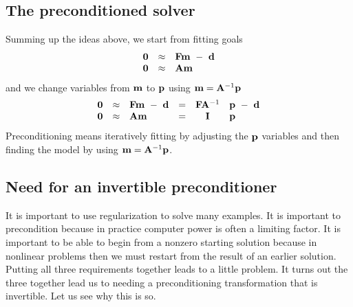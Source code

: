 \subsection{The preconditioned solver}
Summing up the ideas above,
we start from fitting goals
\begin{equation}
\begin{array}{lll}
\label{eq:main}
\bold 0 &\approx& \bold F \bold m \ -\  \bold d \\
\bold 0 &\approx& \bold A \bold m
\end{array}
\end{equation}
and we change variables from
$\bold m$ to $\bold p$ using
$\bold m = \bold A^{-1} \bold p$
\begin{equation}
\begin{array}{llllcl}
\bold 0 &\approx &  \bold F \bold m \ -\  \bold d   &=&
    \bold F  \bold A^{-1} &\bold p  \ -\  \bold d
\\
\bold 0 &\approx &  \bold A \bold m       &=&   \bold I        & \bold p
\end{array}
\label{eqn:precsummary}
\end{equation}
Preconditioning means iteratively fitting
by adjusting the $\bold p$ variables
and then finding the model by using
$\bold m = \bold A^{-1} \bold p$.

\begin{comment}
A new reusable
preconditioned solver is
the module \texttt{solver_prc} \vpageref{lst:solver_prc}.
Likewise the modeling operator $\bold F$ is called \texttt{Fop}
and the smoothing operator $\bold A^{-1}$ is called \texttt{Sop}.
Details of the code are only slightly different from
the regularized solver
\texttt{solver_reg} \vpageref{lst:solver_reg}.

\moddex{solver_prc}{Preconditioned solver}
\end{comment}


\subsection{Need for an invertible preconditioner}
It is important to use regularization to solve many examples.
It is important to precondition because in practice computer power
is often a limiting factor.
It is important to be able to begin from a nonzero starting solution
because in nonlinear problems then we must restart from 
the result of an earlier solution.
Putting all three requirements together leads to a little problem.
It turns out the three together lead us to needing 
a preconditioning transformation that is invertible.
Let us see why this is so.

